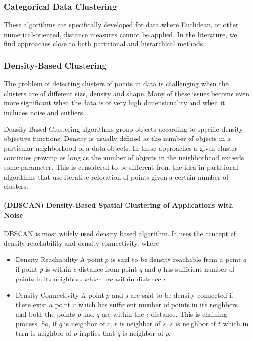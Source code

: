 \subsubsection{Categorical Data Clustering} These algorithms are specifically developed for data where Euclidean, or
other numerical-oriented, distance measures cannot be applied. In the literature, we find approaches
close to both partitional and hierarchical methods.

\subsubsection{Density-Based Clustering} 
The problem of detecting clusters of points in data is challenging when the clusters are of 
different size, density and shape. Many of these issues become even more significant when 
the data is of very high dimensionality and when it includes noise and outliers. 

Density-Based Clustering algorithms group objects according to specific density objective functions.
Density is usually defined as the number of objects in a particular neighborhood of a data objects.
In these approaches a given cluster continues growing as long as the number of objects in the
neighborhood exceeds some parameter. This is considered to be different from the idea in partitional
algorithms that use iterative relocation of points given a certain number of clusters.


\paragraph{(DBSCAN) Density-Based Spatial Clustering of Applications with Noise} DBSCAN is most widely used density based algorithm. It uses the concept of  density reachability and density connectivity\citep{literature_1}. where
\begin{itemize}
\item{Density Reachability} A point $p$ is said to be density reachable from a point $q$ if point $p$ is within $\epsilon$ distance from point $q$ and $q$ has sufficient number of points in its neighbors which are within distance $\epsilon$ .

\item{Density Connectivity} A point $p$ and $q$ are said to be density connected if there exist a point $r$ which has sufficient number of points in its neighbors and both the points $p$ and $q$ are within the $\epsilon$ distance. This is chaining process. So, if $q$ is neighbor of $r$, $r$ is neighbor of $s$, $s$ is neighbor of $t$ which in turn is neighbor of $p$ implies that $q$ is neighbor of $p$.
\end{itemize}

